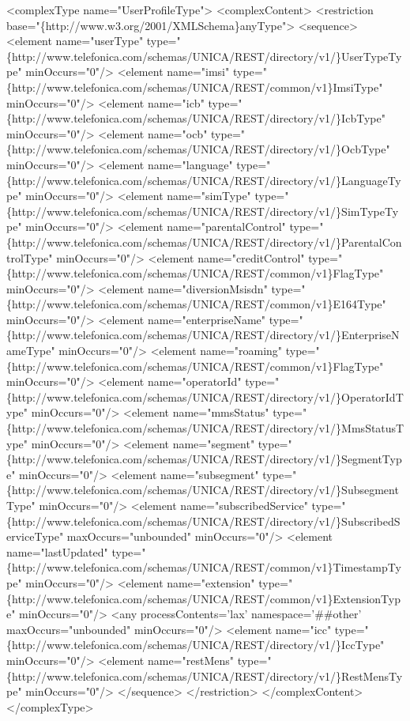 \begin{DoxyPre}
 <complexType name="UserProfileType">
   <complexContent>
     <restriction base="\{http://www.w3.org/2001/XMLSchema\}anyType">
       <sequence>
         <element name="userType" type="\{http://www.telefonica.com/schemas/UNICA/REST/directory/v1/\}UserTypeType" minOccurs="0"/>
         <element name="imsi" type="\{http://www.telefonica.com/schemas/UNICA/REST/common/v1\}ImsiType" minOccurs="0"/>
         <element name="icb" type="\{http://www.telefonica.com/schemas/UNICA/REST/directory/v1/\}IcbType" minOccurs="0"/>
         <element name="ocb" type="\{http://www.telefonica.com/schemas/UNICA/REST/directory/v1/\}OcbType" minOccurs="0"/>
         <element name="language" type="\{http://www.telefonica.com/schemas/UNICA/REST/directory/v1/\}LanguageType" minOccurs="0"/>
         <element name="simType" type="\{http://www.telefonica.com/schemas/UNICA/REST/directory/v1/\}SimTypeType" minOccurs="0"/>
         <element name="parentalControl" type="\{http://www.telefonica.com/schemas/UNICA/REST/directory/v1/\}ParentalControlType" minOccurs="0"/>
         <element name="creditControl" type="\{http://www.telefonica.com/schemas/UNICA/REST/common/v1\}FlagType" minOccurs="0"/>
         <element name="diversionMsisdn" type="\{http://www.telefonica.com/schemas/UNICA/REST/common/v1\}E164Type" minOccurs="0"/>
         <element name="enterpriseName" type="\{http://www.telefonica.com/schemas/UNICA/REST/directory/v1/\}EnterpriseNameType" minOccurs="0"/>
         <element name="roaming" type="\{http://www.telefonica.com/schemas/UNICA/REST/common/v1\}FlagType" minOccurs="0"/>
         <element name="operatorId" type="\{http://www.telefonica.com/schemas/UNICA/REST/directory/v1/\}OperatorIdType" minOccurs="0"/>
         <element name="mmsStatus" type="\{http://www.telefonica.com/schemas/UNICA/REST/directory/v1/\}MmsStatusType" minOccurs="0"/>
         <element name="segment" type="\{http://www.telefonica.com/schemas/UNICA/REST/directory/v1/\}SegmentType" minOccurs="0"/>
         <element name="subsegment" type="\{http://www.telefonica.com/schemas/UNICA/REST/directory/v1/\}SubsegmentType" minOccurs="0"/>
         <element name="subscribedService" type="\{http://www.telefonica.com/schemas/UNICA/REST/directory/v1/\}SubscribedServiceType" maxOccurs="unbounded" minOccurs="0"/>
         <element name="lastUpdated" type="\{http://www.telefonica.com/schemas/UNICA/REST/common/v1\}TimestampType" minOccurs="0"/>
         <element name="extension" type="\{http://www.telefonica.com/schemas/UNICA/REST/common/v1\}ExtensionType" minOccurs="0"/>
         <any processContents='lax' namespace='\##other' maxOccurs="unbounded" minOccurs="0"/>
         <element name="icc" type="\{http://www.telefonica.com/schemas/UNICA/REST/directory/v1/\}IccType" minOccurs="0"/>
         <element name="restMens" type="\{http://www.telefonica.com/schemas/UNICA/REST/directory/v1/\}RestMensType" minOccurs="0"/>
       </sequence>
     </restriction>
   </complexContent>
 </complexType>
 \end{DoxyPre}
 

